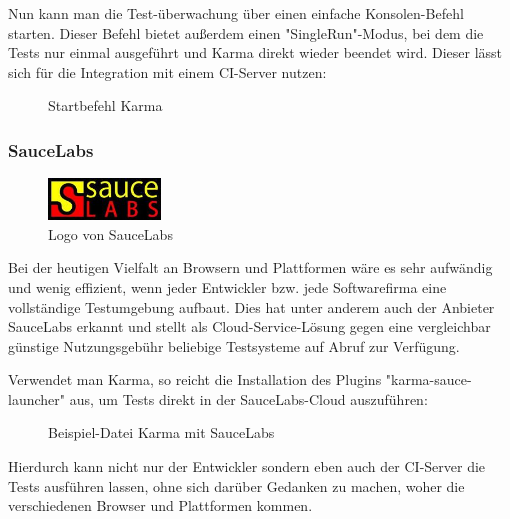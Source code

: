 Nun kann man die Test-überwachung über einen einfache Konsolen-Befehl starten. Dieser Befehl bietet außerdem einen "SingleRun"-Modus, bei dem die Tests nur einmal ausgeführt und Karma direkt wieder beendet wird. Dieser lässt sich für die Integration mit einem CI-Server nutzen:

\begin{figure}[H]
	\begin{center}
		\caption{Startbefehl Karma}
		\label{bash:karma}
	\end{center}
\end{figure}

\subsubsection{SauceLabs}

\begin{figure}[H]
	\begin{center}
		\includegraphics[width=3cm]{bilder/saucelabs}
		\caption{Logo von SauceLabs}
		\label{image:saucelabs}
	\end{center}
\end{figure}

Bei der heutigen Vielfalt an Browsern und Plattformen wäre es sehr aufwändig und wenig effizient, wenn jeder Entwickler bzw. jede Softwarefirma eine vollständige Testumgebung aufbaut. Dies hat unter anderem auch der Anbieter SauceLabs erkannt und stellt als Cloud-Service-Lösung gegen eine vergleichbar günstige Nutzungsgebühr beliebige Testsysteme auf Abruf zur Verfügung.

Verwendet man Karma, so reicht die Installation des Plugins "karma-sauce-launcher" aus, um Tests direkt in der SauceLabs-Cloud auszuführen:

\begin{figure}[H]
	\begin{center}
		\caption{Beispiel-Datei Karma mit SauceLabs}
		\label{code:saucelabs}
	\end{center}
\end{figure}

Hierdurch kann nicht nur der Entwickler sondern eben auch der \ac{CI}-Server die Tests ausführen lassen, ohne sich darüber Gedanken zu machen, woher die verschiedenen Browser und Plattformen kommen.
